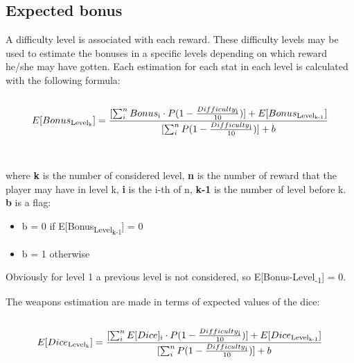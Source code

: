 \subsection{Expected bonus}
A difficulty level is associated with each reward. These difficulty levels may be used to estimate the bonuses in a specific levels depending on which reward he/she may have gotten. Each estimation for each stat in each level is calculated with the following formula: \\\\
\begin{equation}
  E[Bonus\textsubscript{Level\textsubscript{k}}]= \frac{[\sum_{i}^{n} Bonus\textsubscript{i}
  \cdot
  P(1-\frac{Difficulty\textsubscript{i}}{10})]+E[Bonus\textsubscript{Level\textsubscript{k-1}}]}
  {[\sum_{i}^{n}P(1-\frac{Difficulty\textsubscript{i}}{10})]+b}
\end{equation}
\\\\
where \textbf{k} is the number of considered level, \textbf{n} is the number of reward that the player may have in level k, \textbf{i} is the i-th of n, \textbf{k-1} is the number of level before k.\\
\textbf{b} is a flag:
\begin{itemize}
  \item b = 0 if E[Bonus\textsubscript{Level\textsubscript{k-1}}] = 0
  \item b = 1 otherwise
\end{itemize}
Obviously for level 1 a previous level is not considered, so E[Bonus-Level\textsubscript{-1}] = 0.

The weapons estimation are made in terms of expected values of the dice:\\\\
\begin{equation}
  E[Dice\textsubscript{Level\textsubscript{k}}]= \frac{[\sum_{i}^{n} E[Dice]\textsubscript{i}
  \cdot
  P(1-\frac{Difficulty\textsubscript{i}}{10})]+E[Dice\textsubscript{Level\textsubscript{k-1}}]}
  {[\sum_{i}^{n}P(1-\frac{Difficulty\textsubscript{i}}{10})]+b}
\end{equation}


